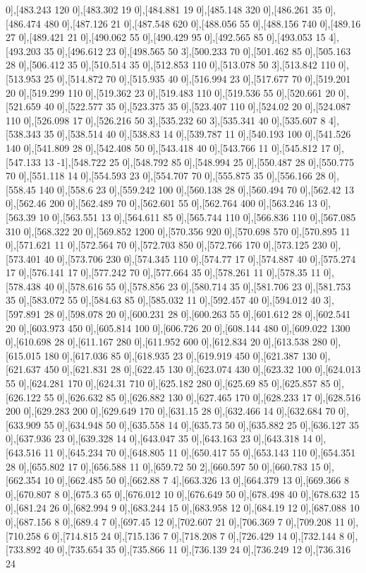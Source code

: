 {0],[483.243 120 0],[483.302 19 0],[484.881 19 0],[485.148 320 0],[486.261 35 0],[486.474 480 0],[487.126 21 0],[487.548 620 0],[488.056 55 0],[488.156 740 0],[489.16 27 0],[489.421 21 0],[490.062 55 0],[490.429 95 0],[492.565 85 0],[493.053 15 4],[493.203 35 0],[496.612 23 0],[498.565 50 3],[500.233 70 0],[501.462 85 0],[505.163 28 0],[506.412 35 0],[510.514 35 0],[512.853 110 0],[513.078 50 3],[513.842 110 0],[513.953 25 0],[514.872 70 0],[515.935 40 0],[516.994 23 0],[517.677 70 0],[519.201 20 0],[519.299 110 0],[519.362 23 0],[519.483 110 0],[519.536 55 0],[520.661 20 0],[521.659 40 0],[522.577 35 0],[523.375 35 0],[523.407 110 0],[524.02 20 0],[524.087 110 0],[526.098 17 0],[526.216 50 3],[535.232 60 3],[535.341 40 0],[535.607 8 4],[538.343 35 0],[538.514 40 0],[538.83 14 0],[539.787 11 0],[540.193 100 0],[541.526 140 0],[541.809 28 0],[542.408 50 0],[543.418 40 0],[543.766 11 0],[545.812 17 0],[547.133 13 -1],[548.722 25 0],[548.792 85 0],[548.994 25 0],[550.487 28 0],[550.775 70 0],[551.118 14 0],[554.593 23 0],[554.707 70 0],[555.875 35 0],[556.166 28 0],[558.45 140 0],[558.6 23 0],[559.242 100 0],[560.138 28 0],[560.494 70 0],[562.42 13 0],[562.46 200 0],[562.489 70 0],[562.601 55 0],[562.764 400 0],[563.246 13 0],[563.39 10 0],[563.551 13 0],[564.611 85 0],[565.744 110 0],[566.836 110 0],[567.085 310 0],[568.322 20 0],[569.852 1200 0],[570.356 920 0],[570.698 570 0],[570.895 11 0],[571.621 11 0],[572.564 70 0],[572.703 850 0],[572.766 170 0],[573.125 230 0],[573.401 40 0],[573.706 230 0],[574.345 110 0],[574.77 17 0],[574.887 40 0],[575.274 17 0],[576.141 17 0],[577.242 70 0],[577.664 35 0],[578.261 11 0],[578.35 11 0],[578.438 40 0],[578.616 55 0],[578.856 23 0],[580.714 35 0],[581.706 23 0],[581.753 35 0],[583.072 55 0],[584.63 85 0],[585.032 11 0],[592.457 40 0],[594.012 40 3],[597.891 28 0],[598.078 20 0],[600.231 28 0],[600.263 55 0],[601.612 28 0],[602.541 20 0],[603.973 450 0],[605.814 100 0],[606.726 20 0],[608.144 480 0],[609.022 1300 0],[610.698 28 0],[611.167 280 0],[611.952 600 0],[612.834 20 0],[613.538 280 0],[615.015 180 0],[617.036 85 0],[618.935 23 0],[619.919 450 0],[621.387 130 0],[621.637 450 0],[621.831 28 0],[622.45 130 0],[623.074 430 0],[623.32 100 0],[624.013 55 0],[624.281 170 0],[624.31 710 0],[625.182 280 0],[625.69 85 0],[625.857 85 0],[626.122 55 0],[626.632 85 0],[626.882 130 0],[627.465 170 0],[628.233 17 0],[628.516 200 0],[629.283 200 0],[629.649 170 0],[631.15 28 0],[632.466 14 0],[632.684 70 0],[633.909 55 0],[634.948 50 0],[635.558 14 0],[635.73 50 0],[635.882 25 0],[636.127 35 0],[637.936 23 0],[639.328 14 0],[643.047 35 0],[643.163 23 0],[643.318 14 0],[643.516 11 0],[645.234 70 0],[648.805 11 0],[650.417 55 0],[653.143 110 0],[654.351 28 0],[655.802 17 0],[656.588 11 0],[659.72 50 2],[660.597 50 0],[660.783 15 0],[662.354 10 0],[662.485 50 0],[662.88 7 4],[663.326 13 0],[664.379 13 0],[669.366 8 0],[670.807 8 0],[675.3 65 0],[676.012 10 0],[676.649 50 0],[678.498 40 0],[678.632 15 0],[681.24 26 0],[682.994 9 0],[683.244 15 0],[683.958 12 0],[684.19 12 0],[687.088 10 0],[687.156 8 0],[689.4 7 0],[697.45 12 0],[702.607 21 0],[706.369 7 0],[709.208 11 0],[710.258 6 0],[714.815 24 0],[715.136 7 0],[718.208 7 0],[726.429 14 0],[732.144 8 0],[733.892 40 0],[735.654 35 0],[735.866 11 0],[736.139 24 0],[736.249 12 0],[736.316 24 }
